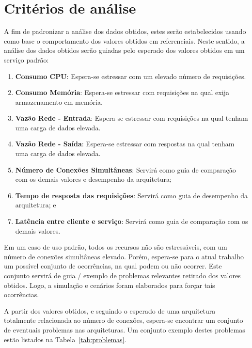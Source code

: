 \section{Critérios de análise}
\label{sec:criterios}

A fim de padronizar a análise dos dados obtidos, estes serão estabelecidos usando como base o comportamento dos valores obtidos em referenciais.
%
Neste sentido, a análise dos dados obtidos serão guiadas pelo esperado dos valores obtidos em um serviço padrão:

\begin{enumerate}
  \item \textbf{Consumo CPU}: Espera-se estressar com um elevado número de requisições.
  \item \textbf{Consumo Memória}: Espera-se estressar com requisições na qual exija armazenamento em memória.
  \item \textbf{Vazão Rede - Entrada}: Espera-se estressar com requisições na qual tenham uma carga de dados elevada.
  \item \textbf{Vazão Rede - Saída}: Espera-se estressar com respostas na qual tenham uma carga de dados elevada.
  \item \textbf{Número de Conexões Simultâneas}: Servirá como guia de comparação com os demais valores e desempenho da arquitetura;
  \item \textbf{Tempo de resposta das requisições}: Servirá como guia de desempenho da arquitetura; e
  \item \textbf{Latência entre cliente e serviço}: Servirá como guia de comparação com os demais valores.
\end{enumerate}

Em um caso de uso padrão, todos os recursos não são estressáveis, com um número de conexões simultâneas elevado.
%
Porém, espera-se para o atual trabalho um possível conjunto de ocorrências, na qual podem ou não ocorrer.
%
Este conjunto servirá de guia / exemplo de problemas relevantes retirado dos valores obtidos.
%
Logo, a simulação e cenários foram elaborados para forçar tais ocorrências.


A partir dos valores obtidos, e seguindo o esperado de uma arquitetura totalmente relacionada ao número de conexões, espera-se encontrar um conjunto de eventuais problemas nas arquiteturas.
%
Um conjunto exemplo destes problemas estão listados na Tabela~\ref{tab:problemas}.
\pagebreak

